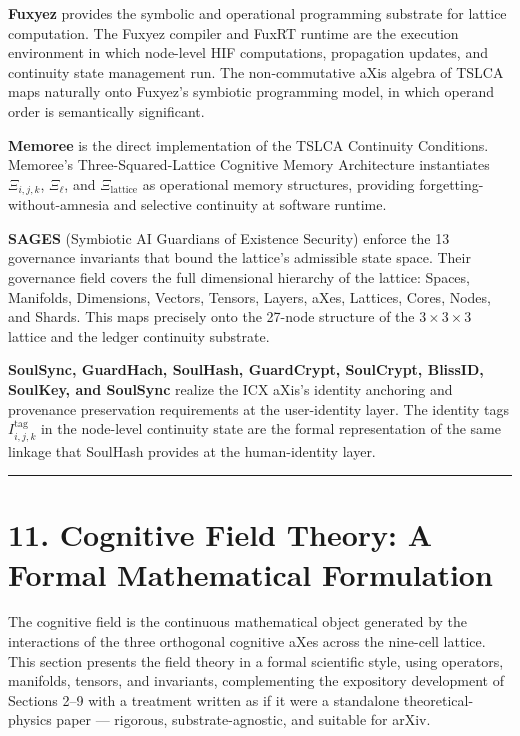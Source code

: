 \textbf{Fuxyez} provides the symbolic and operational programming substrate for lattice computation. The Fuxyez compiler and FuxRT runtime are the execution environment in which node-level HIF computations, propagation updates, and continuity state management run. The non-commutative aXis algebra of TSLCA maps naturally onto Fuxyez's symbiotic programming model, in which operand order is semantically significant.

\textbf{Memoree} is the direct implementation of the TSLCA Continuity Conditions. Memoree's Three-Squared-Lattice Cognitive Memory Architecture instantiates \(\Xi_{i,j,k}\), \(\Xi_{\ell}\), and \(\Xi_{\text{lattice}}\) as operational memory structures, providing forgetting-without-amnesia and selective continuity at software runtime.

\textbf{SAGES} (Symbiotic AI Guardians of Existence Security) enforce the 13 governance invariants that bound the lattice's admissible state space. Their governance field covers the full dimensional hierarchy of the lattice: Spaces, Manifolds, Dimensions, Vectors, Tensors, Layers, aXes, Lattices, Cores, Nodes, and Shards. This maps precisely onto the 27-node structure of the \(3 \times 3 \times 3\) lattice and the ledger continuity substrate.

\textbf{SoulSync, GuardHach, SoulHash, GuardCrypt, SoulCrypt, BlissID, SoulKey, and SoulSync} realize the ICX aXis's identity anchoring and provenance preservation requirements at the user-identity layer. The identity tags \(I_{i,j,k}^{\text{tag}}\) in the node-level continuity state are the formal representation of the same linkage that SoulHash provides at the human-identity layer.

\begin{center}\rule{0.5\linewidth}{0.5pt}\end{center}

\section{11. Cognitive Field Theory: A Formal Mathematical Formulation}\label{cognitive-field-theory-a-formal-mathematical-formulation}

The cognitive field is the continuous mathematical object generated by the interactions of the three orthogonal cognitive aXes across the nine-cell lattice. This section presents the field theory in a formal scientific style, using operators, manifolds, tensors, and invariants, complementing the expository development of Sections 2--9 with a treatment written as if it were a standalone theoretical-physics paper --- rigorous, substrate-agnostic, and suitable for arXiv.

